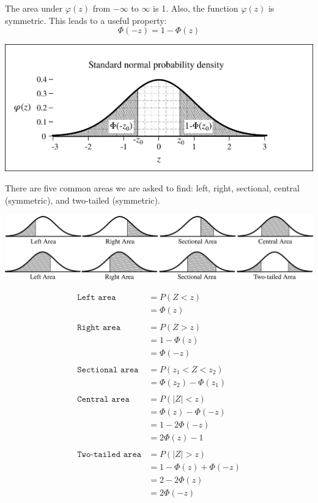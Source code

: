 \documentclass[12pt,letterpaper]{article}
\begin{document}
\newpage
The area under $\varphi(z)$ from $-\infty$ to $\infty$ is 1. Also, the function $\varphi(z)$ is symmetric. This leads to a useful property:
$$\Phi(-z) = 1-\Phi(z) $$
\begin{center}
\includegraphics[scale=0.7]{prop.png}
\end{center}

There are five common areas we are asked to find: left, right, sectional, central (symmetric), and two-tailed (symmetric).
\begin{center}
\includegraphics[scale=0.7]{types.png}
\end{center}
\begin{align*}
\texttt{Left area} &= P(Z<z)\\
 &= \Phi(z)\\\\
\texttt{Right area} &= P(Z>z) \\&= 1-\Phi(z) \\&= \Phi(-z)\\\\
\texttt{Sectional area} &= P(z_1<Z<z_2) \\&= \Phi(z_2) - \Phi(z_1)\\\\
\texttt{Central area} &= P(|Z|<z) \\&= \Phi(z)-\Phi(-z) \\&= 1-2\Phi(-z)\\ &= 2\Phi(z)-1\\\\
\texttt{Two-tailed area} &= P(|Z|>z) \\ &= 1-\Phi(z)+\Phi(-z) \\&=2-2\Phi(z) \\ &= 2\Phi(-z)
\end{align*}
\label{hi}
\end{document}
